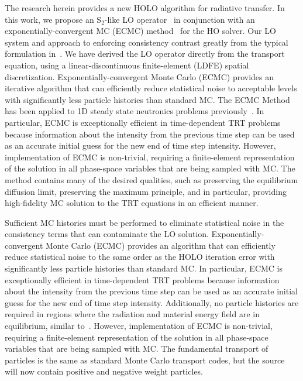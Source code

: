 The research herein provides a new HOLO algorithm for radiative transfer.
In this work, we propose an S$_2$-like LO operator~\cite{wolters}
in conjunction with an exponentially-convergent MC (ECMC) method~\cite{jake} for the
HO solver. Our LO system and approach to enforcing consistency contrast greatly from the typical formulation
in~\cite{rmc,willert,park}. We have derived the LO operator directly from the transport
equation, using a linear-discontinuous finite-element (LDFE) spatial
discretization.   
Exponentially-convergent Monte Carlo (ECMC)\cite{jake,ans_2014} provides an iterative algorithm that can efficiently
reduce statistical noise to acceptable levels with
significantly less particle histories than standard MC. 
The ECMC Method has been applied to 1D steady state neutronics problems
previously~\cite{jake}.
In particular, ECMC is
exceptionally efficient in time-dependent TRT problems because information about the
intensity from the previous time step can be used as an accurate initial guess for
the new end of time step intensity.   However, implementation
of ECMC is non-trivial, requiring a finite-element representation of the solution in
all phase-space variables that are being sampled with MC.  
The method contains many of the desired qualities, such as
preserving the equilibrium diffusion limit, preserving the maximum principle, and in
particular, providing high-fidelity MC solution to the TRT equations in an efficient
manner.

Sufficient MC histories must be performed to eliminate statistical
noise in the consistency terms that can contaminate the LO solution.
Exponentially-convergent Monte Carlo (ECMC)\cite{jake,ans_2014} provides an algorithm that can efficiently
reduce statistical noise to the same order as the HOLO iteration error with
significantly less particle histories than standard MC. In particular, ECMC is
exceptionally efficient in time-dependent TRT problems because information about the
intensity from the previous time step can be used as an accurate initial guess for
the new end of time step intensity. Additionally, no particle histories are required
in regions where the radiation and material energy field are in equilibrium, similar to~\cite{rmc}.  However, implementation
of ECMC is non-trivial, requiring a finite-element representation of the solution in
all phase-space variables that are being sampled with MC.  The fundamental transport of particles is the same
as standard Monte Carlo transport codes, but the source will now contain positive and
negative weight particles.


